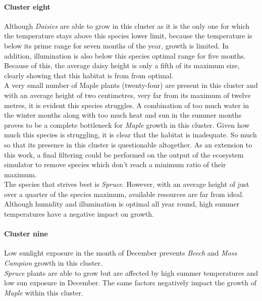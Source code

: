 \paragraph{Cluster eight}

Although \textit{Daisies} are able to grow in this cluster as it is the only one for which the temperature stays above this species lower limit, because the temperature is below its prime range for seven months of the year, growth is limited. In addition, illumination is also below this species optimal range for five months. Because of this, the average daisy height is only a fifth of its maximum size, clearly showing that this habitat is from from optimal.\\
A very small number of Maple plants (twenty-four) are present in this cluster and with an average height of two centimetres, very far from its maximum of twelve metres, it is evident this species struggles. A combination of too much water in the winter months along with too much heat and sun in the summer months proves to be a complete bottleneck for \textit{Maple} growth in this cluster. Given how much this species is struggling, it is clear that the habitat is inadequate. So much so that its presence in this cluster is questionable altogether. As an extension to this work, a final filtering could be performed on the output of the ecosystem simulator to remove species which don't reach a minimum ratio of their maximum.\\
The species that strives best is \textit{Spruce}. However, with an average height of just over a quarter of the species maximum, available resources are far from ideal. Although humidity and illumination is optimal all year round, high summer temperatures have a negative impact on growth.\\

\paragraph{Cluster nine}

Low sunlight exposure in the month of December prevents \textit{Beech} and \textit{Moss Campion} growth in this cluster.\\
\textit{Spruce} plants are able to grow but are affected by high summer temperatures and low sun exposure in December. The same factors negatively impact the growth of \textit{Maple} within this cluster.\\
